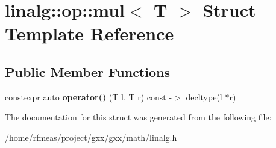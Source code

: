 \hypertarget{structlinalg_1_1op_1_1mul}{}\section{linalg\+:\+:op\+:\+:mul$<$ T $>$ Struct Template Reference}
\label{structlinalg_1_1op_1_1mul}
\subsection*{Public Member Functions}
\begin{DoxyCompactItemize}
\item 
constexpr auto {\bfseries operator()} (T l, T r) const -\/$>$ decltype(l $\ast$r)\hypertarget{structlinalg_1_1op_1_1mul_ac848b9c4bb69b34ca245200652f9ee35}{}\label{structlinalg_1_1op_1_1mul_ac848b9c4bb69b34ca245200652f9ee35}

\end{DoxyCompactItemize}


The documentation for this struct was generated from the following file\+:\begin{DoxyCompactItemize}
\item 
/home/rfmeas/project/gxx/gxx/math/linalg.\+h\end{DoxyCompactItemize}
